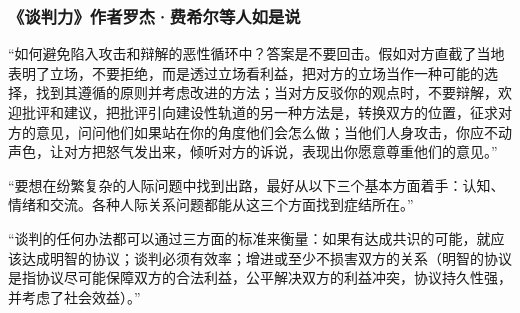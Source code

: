 \subsubsection*{《谈判力》作者罗杰·费希尔等人如是说}

“如何避免陷入攻击和辩解的恶性循环中？答案是不要回击。假如对方直截了当地表明了立场，不要拒绝，而是透过立场看利益，把对方的立场当作一种可能的选择，找到其遵循的原则并考虑改进的方法；当对方反驳你的观点时，不要辩解，欢迎批评和建议，把批评引向建设性轨道的另一种方法是，转换双方的位置，征求对方的意见，问问他们如果站在你的角度他们会怎么做；当他们人身攻击，你应不动声色，让对方把怒气发出来，倾听对方的诉说，表现出你愿意尊重他们的意见。”
\par

“要想在纷繁复杂的人际问题中找到出路，最好从以下三个基本方面着手：认知、情绪和交流。各种人际关系问题都能从这三个方面找到症结所在。”
\par

“谈判的任何办法都可以通过三方面的标准来衡量：如果有达成共识的可能，就应该达成明智的协议；谈判必须有效率；增进或至少不损害双方的关系（明智的协议是指协议尽可能保障双方的合法利益，公平解决双方的利益冲突，协议持久性强，并考虑了社会效益）。”
\par
